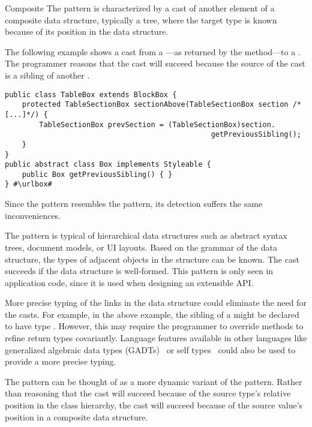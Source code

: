 \begin{pattern}{Composite}
The \thisp{} pattern is characterized by a cast of another element of a
composite data structure, typically a tree, where the target type is known because of its
position in the data structure.

\instancessrc{}
The following example shows a cast from a ---as returned by the  method---to a .
The programmer reasons that the cast will succeed because the 
source of the cast is a sibling of another .

\def\urlvar{http://bit.ly/flyingsaucerproject_flyingsaucer_2N2nYbY}
\begin{verbatim}
public class TableBox extends BlockBox {
    protected TableSectionBox sectionAbove(TableSectionBox section /*[...]*/) {
        TableSectionBox prevSection = (TableSectionBox)section.
                                                getPreviousSibling();
    }
}
public abstract class Box implements Styleable {
    public Box getPreviousSibling() { }
} #\urlbox#
\end{verbatim}


\detection{}
Since the \thisp{} pattern resembles the  pattern,
its detection suffers the same inconveniences.


\issues{}
The pattern is typical of hierarchical data structures such as abstract syntax
trees, document models, or UI layouts. Based on the grammar of 
the data structure, the types of adjacent objects in the structure can be known.
The cast succeeds if the data structure is well-formed.
This pattern is only seen in application code,
since it is used when designing an extensible API.

More precise typing of the links in the data structure could 
eliminate the need for the casts. For example, in the above example,
the sibling of a  might be declared to have type
. However, this may require the programmer to override
methods to refine return types covariantly.
Language features available in other languages like generalized algebraic data types (GADTs)~\citep{gadts} or self types~\citep{bruceChallengingTypingIssues2003,scalaIndependentlyExtensible} could also be used to provide a more precise typing.

The pattern can be thought of as a more dynamic variant of the
 pattern. Rather than
reasoning that the cast will succeed because of the source type's relative position in the 
class hierarchy, the cast will succeed because of the source value's position
in a composite data structure.

\end{pattern}
